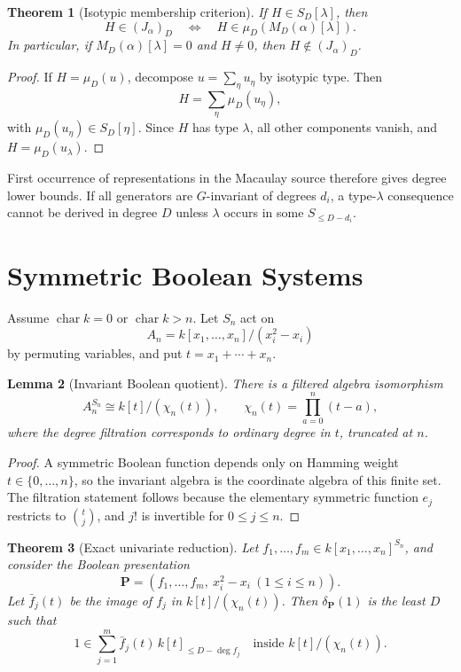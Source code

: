 \documentclass[11pt]{article}
\newtheorem{theorem}{Theorem}[section]
\newtheorem{lemma}[theorem]{Lemma}
\DeclareMathOperator{\charac}{char}
\begin{document}
\begin{theorem}[Isotypic membership criterion]
If \(H\in S_D[\lambda]\), then
\[
H\in (J_\alpha)_D
\quad\Longleftrightarrow\quad
H\in \mu_D(M_D(\alpha)[\lambda]).
\]
In particular, if \(M_D(\alpha)[\lambda]=0\) and \(H\ne0\), then \(H\notin (J_\alpha)_D\).
\end{theorem}

\begin{proof}
If \(H=\mu_D(u)\), decompose \(u=\sum_\eta u_\eta\) by isotypic type. Then
\[
H=\sum_\eta \mu_D(u_\eta),
\]
with \(\mu_D(u_\eta)\in S_D[\eta]\). Since \(H\) has type \(\lambda\), all other components vanish, and \(H=\mu_D(u_\lambda)\).
\end{proof}

First occurrence of representations in the Macaulay source therefore gives degree lower bounds. If all generators are \(G\)-invariant of degrees \(d_i\), a type-\(\lambda\) consequence cannot be derived in degree \(D\) unless \(\lambda\) occurs in some \(S_{\le D-d_i}\).

\section{Symmetric Boolean Systems}

Assume \(\charac k=0\) or \(\charac k>n\). Let \(S_n\) act on
\[
A_n=k[x_1,\ldots,x_n]/(x_i^2-x_i)
\]
by permuting variables, and put \(t=x_1+\cdots+x_n\).

\begin{lemma}[Invariant Boolean quotient]
There is a filtered algebra isomorphism
\[
A_n^{S_n}
\cong
k[t]/(\chi_n(t)),
\qquad
\chi_n(t)=\prod_{a=0}^n(t-a),
\]
where the degree filtration corresponds to ordinary degree in \(t\), truncated at \(n\).
\end{lemma}

\begin{proof}
A symmetric Boolean function depends only on Hamming weight \(t\in\{0,\ldots,n\}\), so the invariant algebra is the coordinate algebra of this finite set. The filtration statement follows because the elementary symmetric function \(e_j\) restricts to \(\binom tj\), and \(j!\) is invertible for \(0\le j\le n\).
\end{proof}

\begin{theorem}[Exact univariate reduction]
Let \(f_1,\ldots,f_m\in k[x_1,\ldots,x_n]^{S_n}\), and consider the Boolean presentation
\[
\mathbf P=(f_1,\ldots,f_m,\ x_i^2-x_i\ (1\le i\le n)).
\]
Let \(\bar f_j(t)\) be the image of \(f_j\) in \(k[t]/(\chi_n(t))\). Then \(\delta_{\mathbf P}(1)\) is the least \(D\) such that
\[
1\in
\sum_{j=1}^m
\bar f_j(t)\,k[t]_{\le D-\deg f_j}
\quad\text{inside }k[t]/(\chi_n(t)).
\]
\end{theorem}
\end{document}

